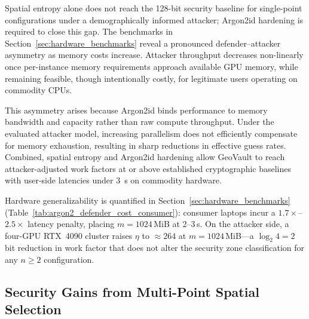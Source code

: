 \documentclass[mathematics,article,accept,pdftex,moreauthors]{Definitions/mdpi}
\begin{document}
{Spatial entropy alone does not reach the 128-bit security baseline for single-point configurations under a demographically informed attacker; Argon2id hardening is required to close this gap. The benchmarks in Section~\ref{sec:hardware_benchmarks} reveal a pronounced defender--attacker asymmetry as memory costs increase.} Attacker throughput decreases non-linearly once per-instance memory requirements approach available GPU memory, while remaining feasible, though intentionally costly, for legitimate users operating on commodity CPUs.

This asymmetry arises because Argon2id binds performance to memory bandwidth and capacity rather than raw compute throughput. Under the evaluated attacker model, increasing parallelism does not efficiently compensate for memory exhaustion, resulting in sharp reductions in effective guess rates. %
{Combined, spatial entropy and Argon2id hardening allow GeoVault to reach attacker-adjusted work factors at or above established cryptographic baselines with user-side latencies under 3~s on commodity hardware.}

{Hardware generalizability is quantified in Section~\ref{sec:hardware_benchmarks} (Table~\ref{tab:argon2_defender_cost_consumer}): consumer laptops incur a $1.7\times$--$2.5\times$ latency penalty, placing $m=1024$\,MiB at 2--3\,s. On the attacker side, a four-GPU RTX~4090 cluster raises $\eta$ to $\approx$$264$ at $m=1024$\,MiB---a $\log_2 4 = 2$\,bit reduction in work factor that does not alter the security zone classification for any $n \geq 2$ configuration.}

\subsection{Security Gains from Multi-Point Spatial Selection}
\end{document}
